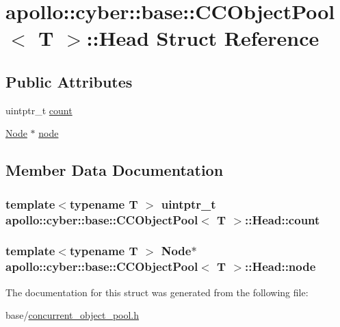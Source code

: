\hypertarget{structapollo_1_1cyber_1_1base_1_1CCObjectPool_1_1Head}{\section{apollo\-:\-:cyber\-:\-:base\-:\-:C\-C\-Object\-Pool$<$ T $>$\-:\-:Head Struct Reference}
\label{structapollo_1_1cyber_1_1base_1_1CCObjectPool_1_1Head}
}
\subsection*{Public Attributes}
\begin{DoxyCompactItemize}
\item 
uintptr\-\_\-t \hyperlink{structapollo_1_1cyber_1_1base_1_1CCObjectPool_1_1Head_a634e0d4acbff58d1f9484f90eccfc56a}{count}
\item 
\hyperlink{structapollo_1_1cyber_1_1base_1_1CCObjectPool_1_1Node}{Node} $\ast$ \hyperlink{structapollo_1_1cyber_1_1base_1_1CCObjectPool_1_1Head_a069db95d820e82efff968314caf2b737}{node}
\end{DoxyCompactItemize}


\subsection{Member Data Documentation}
\hypertarget{structapollo_1_1cyber_1_1base_1_1CCObjectPool_1_1Head_a634e0d4acbff58d1f9484f90eccfc56a}{
\subsubsection[{count}]{\setlength{\rightskip}{0pt plus 5cm}template$<$typename T $>$ uintptr\-\_\-t {\bf apollo\-::cyber\-::base\-::\-C\-C\-Object\-Pool}$<$ T $>$\-::Head\-::count}}\label{structapollo_1_1cyber_1_1base_1_1CCObjectPool_1_1Head_a634e0d4acbff58d1f9484f90eccfc56a}
\hypertarget{structapollo_1_1cyber_1_1base_1_1CCObjectPool_1_1Head_a069db95d820e82efff968314caf2b737}{
\subsubsection[{node}]{\setlength{\rightskip}{0pt plus 5cm}template$<$typename T $>$ {\bf Node}$\ast$ {\bf apollo\-::cyber\-::base\-::\-C\-C\-Object\-Pool}$<$ T $>$\-::Head\-::node}}\label{structapollo_1_1cyber_1_1base_1_1CCObjectPool_1_1Head_a069db95d820e82efff968314caf2b737}


The documentation for this struct was generated from the following file\-:\begin{DoxyCompactItemize}
\item 
base/\hyperlink{concurrent__object__pool_8h}{concurrent\-\_\-object\-\_\-pool.\-h}\end{DoxyCompactItemize}
